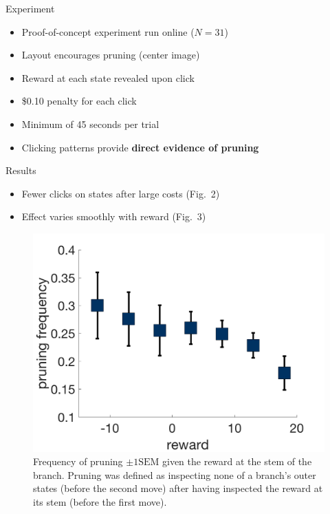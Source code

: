 \documentclass[final]{beamer}
\newlength{\onecolwid}
\begin{document}
\begin{frame}[t, fragile]
\begin{columns}[t]
\begin{column}{\onecolwid}
  \begin{block}{Experiment}\label{experiment}
    \begin{itemize}
      \item Proof-of-concept experiment run online ($N=31$)
      \item Layout encourages pruning (center image)
      \item Reward at each state revealed upon click
      \item \$0.10 penalty for each click
      \item Minimum of 45 seconds per trial
      \item Clicking patterns provide \textbf{direct evidence of pruning}
    \end{itemize}
  \end{block}

  \begin{block}{Results}\label{results}

    \begin{itemize}
      \item Fewer clicks on states after large costs (Fig.~2)
      \item Effect varies smoothly with reward (Fig.~3)
    \end{itemize}
  \end{block}

  \begin{figure}
    \label{fig:pruning}
    \includegraphics[width=0.9\linewidth]{figs/prunning_any_noFB.png}
    \captionsetup{width=0.9\linewidth}
    \caption[first]{Frequency of pruning $\pm 1 \text{SEM}$ given the reward at the stem of the branch. Pruning was defined as inspecting none of a branch's outer states (before the second move) after having inspected the reward at its stem (before the first move).}
  \end{figure}


\end{column}
\end{columns}
\end{frame}
\end{document}
